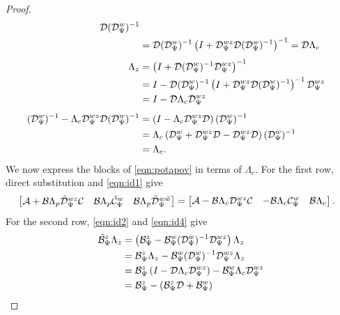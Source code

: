 \begin{proof}
\begin{align}
           \mathcal{D}(\mathcal{D}_\Psi^w)^{-1}
           \notag\\
        &= \mathcal{D}(\mathcal{D}_\Psi^w)^{-1}
           \left(I+\mathcal{D}_\Psi^{wz}\mathcal{D}(\mathcal{D}_\Psi^w)^{-1}\right)^{-1}
         = \mathcal{D}\Lambda_c
           \label{eqn:id3}\\[4pt]
    \Lambda_z
        &= \left(I+\mathcal{D}(\mathcal{D}_\Psi^w)^{-1}\mathcal{D}_\Psi^{wz}\right)^{-1}
           \notag\\
        &= I-\mathcal{D}(\mathcal{D}_\Psi^w)^{-1}
           \left(I+\mathcal{D}_\Psi^{wz}\mathcal{D}(\mathcal{D}_\Psi^w)^{-1}\right)^{-1}
           \mathcal{D}_\Psi^{wz}
           \notag\\
        &= I-\mathcal{D}\Lambda_c\mathcal{D}_\Psi^{wz}
           \label{eqn:id4}\\[4pt]
    (\mathcal{D}_\Psi^w)^{-1}
        -\Lambda_c\mathcal{D}_\Psi^{wz}\mathcal{D}(\mathcal{D}_\Psi^w)^{-1}
        &= \left(I-\Lambda_c\mathcal{D}_\Psi^{wz}\mathcal{D}\right)
           (\mathcal{D}_\Psi^w)^{-1}
           \notag\\
        &= \Lambda_c\left(\mathcal{D}_\Psi^w
           +\mathcal{D}_\Psi^{wz}\mathcal{D}
           -\mathcal{D}_\Psi^{wz}\mathcal{D}\right)(\mathcal{D}_\Psi^w)^{-1}
           \notag\\
        &= \Lambda_c.
           \label{eqn:id5}
\end{align}
We now express the blocks of \eqref{eqn:potapov} in terms of
$\Lambda_c$.  For the first row, direct substitution and
\eqref{eqn:id1} give
\begin{align*}
&\begin{bmatrix}
    \mathcal{A}+\mathcal{B}\Lambda_p\hat{\mathcal{D}}_\Psi^{wz}\mathcal{C} &
    \mathcal{B}\Lambda_p\hat{\mathcal{C}}_\Psi^w &
    \mathcal{B}\Lambda_p\hat{\mathcal{D}}_\Psi^{w\tilde{w}}\end{bmatrix} =
\begin{bmatrix}
    \mathcal{A}-\mathcal{B}\Lambda_c\mathcal{D}_\Psi^{wz}\mathcal{C} &
    -\mathcal{B}\Lambda_c\mathcal{C}_\Psi^w &
    \mathcal{B}\Lambda_c\end{bmatrix}.
\end{align*}
For the second row,
\eqref{eqn:id2} and \eqref{eqn:id4} give
\begin{align*}
    \hat{\mcl{B}}_\Psi^z\Lambda_z
        &= \left(\mcl{B}_\Psi^z
            -\mcl{B}_\Psi^w(\mcl{D}_\Psi^w)^{-1}
             \mcl{D}_\Psi^{wz}\right)
            \Lambda_z\\
        &= \mcl{B}_\Psi^z\Lambda_z
            -\mcl{B}_\Psi^w(\mcl{D}_\Psi^w)^{-1}
             \mcl{D}_\Psi^{wz}\Lambda_z\\
        &= \mcl{B}_\Psi^z
            \left(I-\mcl{D}\Lambda_c\mcl{D}_\Psi^{wz}\right)
            -\mcl{B}_\Psi^w\Lambda_c\mcl{D}_\Psi^{wz}\\
        &= \mcl{B}_\Psi^z
            -\left(\mcl{B}_\Psi^z\mcl{D}+\mcl{B}_\Psi^w\right)

\end{align*}
\end{proof}
